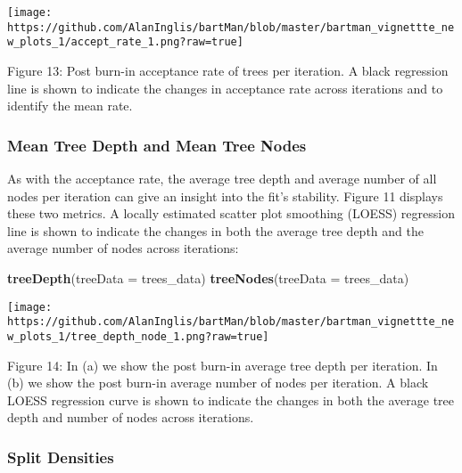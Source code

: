 \documentclass[
]{article}
\newenvironment{Shaded}{\begin{snugshade}}{\end{snugshade}}
\newcommand{\AttributeTok}[1]{\textcolor[rgb]{0.13,0.29,0.53}{#1}}
\newcommand{\FunctionTok}[1]{\textcolor[rgb]{0.13,0.29,0.53}{\textbf{#1}}}
\newcommand{\NormalTok}[1]{#1}
\begin{document}
\begin{center}\texttt{[image: https://github.com/AlanInglis/bartMan/blob/master/bartman\_vignettte\_new\_plots\_1/accept\_rate\_1.png?raw=true]} \end{center}

\protect\hypertarget{fig13:fig13}{}{Figure 13: } Post burn-in acceptance
rate of trees per iteration. A black regression line is shown to
indicate the changes in acceptance rate across iterations and to
identify the mean rate.

\hypertarget{mean-tree-depth-and-mean-tree-nodes}{%
\subsubsection{Mean Tree Depth and Mean Tree
Nodes}\label{mean-tree-depth-and-mean-tree-nodes}}

As with the acceptance rate, the average tree depth and average number
of all nodes per iteration can give an insight into the fit's stability.
Figure 11 displays these two metrics. A locally estimated scatter plot
smoothing (LOESS) regression line is shown to indicate the changes in
both the average tree depth and the average number of nodes across
iterations:

\begin{Shaded}
\begin{Highlighting}[]
\FunctionTok{treeDepth}\NormalTok{(}\AttributeTok{treeData =}\NormalTok{ trees\_data)}
\FunctionTok{treeNodes}\NormalTok{(}\AttributeTok{treeData =}\NormalTok{ trees\_data)}
\end{Highlighting}
\end{Shaded}

\begin{center}\texttt{[image: https://github.com/AlanInglis/bartMan/blob/master/bartman\_vignettte\_new\_plots\_1/tree\_depth\_node\_1.png?raw=true]} \end{center}

\protect\hypertarget{fig14:fig14}{}{Figure 14: } In (a) we show the post
burn-in average tree depth per iteration. In (b) we show the post
burn-in average number of nodes per iteration. A black LOESS regression
curve is shown to indicate the changes in both the average tree depth
and number of nodes across iterations.

\hypertarget{split-densities}{%
\subsubsection{Split Densities}\label{split-densities}}
\end{document}
